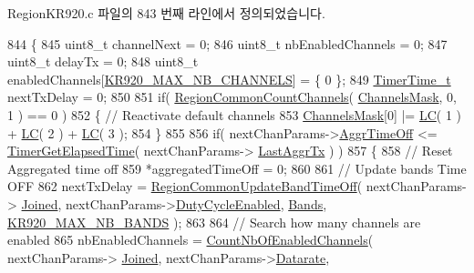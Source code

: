 Region\+K\+R920.\+c 파일의 843 번째 라인에서 정의되었습니다.


\begin{DoxyCode}
844 \{
845     uint8\_t channelNext = 0;
846     uint8\_t nbEnabledChannels = 0;
847     uint8\_t delayTx = 0;
848     uint8\_t enabledChannels[\mbox{\hyperlink{group___r_e_g_i_o_n_k_r920_ga28705c59a2c19a1de8b22d294fc6bebb}{KR920\_MAX\_NB\_CHANNELS}}] = \{ 0 \};
849     \mbox{\hyperlink{utilities_8h_a4215ca43d3e953099ea758ce428599d0}{TimerTime\_t}} nextTxDelay = 0;
850 
851     \textcolor{keywordflow}{if}( \mbox{\hyperlink{group___r_e_g_i_o_n_c_o_m_m_o_n_gac23f0831812f610f57f42f6cf87368c9}{RegionCommonCountChannels}}( \mbox{\hyperlink{_region_k_r920_8c_a2188957b5ca6af8092154d7ccbfa5757}{ChannelsMask}}, 0, 1 ) == 0 )
852     \{ \textcolor{comment}{// Reactivate default channels}
853         \mbox{\hyperlink{_region_k_r920_8c_a2188957b5ca6af8092154d7ccbfa5757}{ChannelsMask}}[0] |= \mbox{\hyperlink{group___r_e_g_i_o_n_ga12fa17e5c1016e01a9d82c25027deb1b}{LC}}( 1 ) + \mbox{\hyperlink{group___r_e_g_i_o_n_ga12fa17e5c1016e01a9d82c25027deb1b}{LC}}( 2 ) + \mbox{\hyperlink{group___r_e_g_i_o_n_ga12fa17e5c1016e01a9d82c25027deb1b}{LC}}( 3 );
854     \}
855 
856     \textcolor{keywordflow}{if}( nextChanParams->\mbox{\hyperlink{structs_next_chan_params_a3609676d2d3b7c00e25615324b35cb26}{AggrTimeOff}} <= \mbox{\hyperlink{time_server_8c_a9ca7e27f3d6474daff63f2e093a2e91e}{TimerGetElapsedTime}}( nextChanParams->
      \mbox{\hyperlink{structs_next_chan_params_a381b728f60b185ecf3313e974c18768b}{LastAggrTx}} ) )
857     \{
858         \textcolor{comment}{// Reset Aggregated time off}
859         *aggregatedTimeOff = 0;
860 
861         \textcolor{comment}{// Update bands Time OFF}
862         nextTxDelay = \mbox{\hyperlink{group___r_e_g_i_o_n_c_o_m_m_o_n_ga2e26fe6b49ca26edf7052eadd7f18b3a}{RegionCommonUpdateBandTimeOff}}( nextChanParams->
      \mbox{\hyperlink{structs_next_chan_params_ac2f6caa0f3b02d2ac5056c3ee7c22652}{Joined}}, nextChanParams->\mbox{\hyperlink{structs_next_chan_params_a4d755868e0e80089462286c3ba6a6f18}{DutyCycleEnabled}}, \mbox{\hyperlink{_region_k_r920_8c_a12f2ea1fb6e7f8812338a8192ce15797}{Bands}}, 
      \mbox{\hyperlink{group___r_e_g_i_o_n_k_r920_ga583dc0020ee40c41d888685baadfea12}{KR920\_MAX\_NB\_BANDS}} );
863 
864         \textcolor{comment}{// Search how many channels are enabled}
865         nbEnabledChannels = \mbox{\hyperlink{_region_k_r920_8c_a84ed01aa0ea6f1e53707efb5aaa3bd97}{CountNbOfEnabledChannels}}( nextChanParams->
      \mbox{\hyperlink{structs_next_chan_params_ac2f6caa0f3b02d2ac5056c3ee7c22652}{Joined}}, nextChanParams->\mbox{\hyperlink{structs_next_chan_params_ae2f6080f3aa0e9485c55513ca56bb24d}{Datarate}},

\end{DoxyCode}
